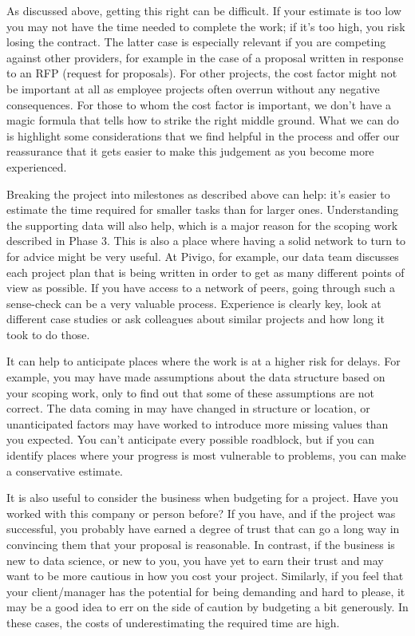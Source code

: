 \documentclass[
]{book}
\begin{document}
As discussed above, getting this right can be difficult. If your estimate is too low you may not have the time needed to complete the work; if it's too high, you risk losing the contract. The latter case is especially relevant if you are competing against other providers, for example in the case of a proposal written in response to an RFP (request for proposals). For other projects, the cost factor might not be important at all as employee projects often overrun without any negative consequences. For those to whom the cost factor is important, we don't have a magic formula that tells how to strike the right middle ground. What we can do is highlight some considerations that we find helpful in the process and offer our reassurance that it gets easier to make this judgement as you become more experienced.

Breaking the project into milestones as described above can help: it's easier to estimate the time required for smaller tasks than for larger ones. Understanding the supporting data will also help, which is a major reason for the scoping work described in Phase 3. This is also a place where having a solid network to turn to for advice might be very useful. At Pivigo, for example, our data team discusses each project plan that is being written in order to get as many different points of view as possible. If you have access to a network of peers, going through such a sense-check can be a very valuable process. Experience is clearly key, look at different case studies or ask colleagues about similar projects and how long it took to do those.

It can help to anticipate places where the work is at a higher risk for delays. For example, you may have made assumptions about the data structure based on your scoping work, only to find out that some of these assumptions are not correct. The data coming in may have changed in structure or location, or unanticipated factors may have worked to introduce more missing values than you expected. You can't anticipate every possible roadblock, but if you can identify places where your progress is most vulnerable to problems, you can make a conservative estimate.

It is also useful to consider the business when budgeting for a project. Have you worked with this company or person before? If you have, and if the project was successful, you probably have earned a degree of trust that can go a long way in convincing them that your proposal is reasonable. In contrast, if the business is new to data science, or new to you, you have yet to earn their trust and may want to be more cautious in how you cost your project. Similarly, if you feel that your client/manager has the potential for being demanding and hard to please, it may be a good idea to err on the side of caution by budgeting a bit generously. In these cases, the costs of underestimating the required time are high.
\end{document}
